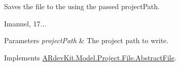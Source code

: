 Saves the file to the using the passed project\-Path. 

Imanuel, 17... 


\begin{DoxyParams}{Parameters}
{\em project\-Path} & The project path to write. \\
\hline
\end{DoxyParams}


Implements \hyperlink{class_a_rdev_kit_1_1_model_1_1_project_1_1_file_1_1_abstract_file_ae49c3262c59642e8f519d0655bbbbbab}{A\-Rdev\-Kit.\-Model.\-Project.\-File.\-Abstract\-File}.

